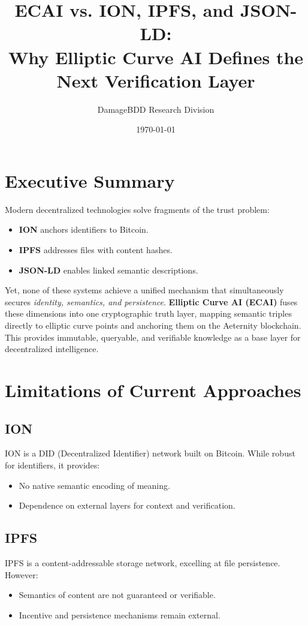 \documentclass[12pt]{article}
\title{\textbf{ECAI vs. ION, IPFS, and JSON-LD: \\ Why Elliptic Curve AI Defines the Next Verification Layer}}
\author{DamageBDD Research Division}
\date{\today}
\begin{document}
\maketitle

\section*{Executive Summary}
Modern decentralized technologies solve fragments of the trust problem:
\begin{itemize}[leftmargin=*]
    \item \textbf{ION} anchors identifiers to Bitcoin.
    \item \textbf{IPFS} addresses files with content hashes.
    \item \textbf{JSON-LD} enables linked semantic descriptions.
\end{itemize}
Yet, none of these systems achieve a unified mechanism that simultaneously secures \emph{identity, semantics, and persistence}.  
\textbf{Elliptic Curve AI (ECAI)} fuses these dimensions into one cryptographic truth layer, mapping semantic triples directly to elliptic curve points and anchoring them on the Aeternity blockchain.  
This provides immutable, queryable, and verifiable knowledge as a base layer for decentralized intelligence.

\section{Limitations of Current Approaches}
\subsection{ION}
ION is a DID (Decentralized Identifier) network built on Bitcoin. While robust for identifiers, it provides:
\begin{itemize}[leftmargin=*]
    \item No native semantic encoding of meaning.
    \item Dependence on external layers for context and verification.
\end{itemize}

\subsection{IPFS}
IPFS is a content-addressable storage network, excelling at file persistence. However:
\begin{itemize}[leftmargin=*]
    \item Semantics of content are not guaranteed or verifiable.
    \item Incentive and persistence mechanisms remain external.
\end{itemize}
\end{document}
